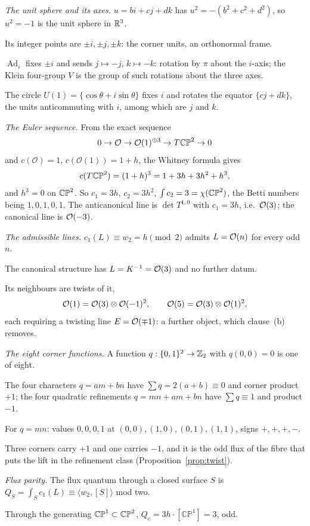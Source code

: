\documentclass[11pt,a4paper]{article}
\theoremstyle{plain}
\theoremstyle{definition}
\theoremstyle{remark}
\newcommand{\Ad}{\operatorname{Ad}}
\begin{document}
\emph{The unit sphere and its axes.} $u=bi+cj+dk$ has $u^{2}=-(b^{2}+c^{2}+d^{2})$, so $u^{2}=-1$ is the unit sphere in $\mathbb{R}^{3}$.

Its integer points are $\pm i,\pm j,\pm k$: the corner units, an orthonormal frame.

$\Ad_{i}$ fixes $\pm i$ and sends $j\mapsto-j$, $k\mapsto-k$: rotation by $\pi$ about the $i$-axis; the Klein four-group $V$ is the group of such rotations about the three axes.

The circle $U(1)=\{\cos\theta+i\sin\theta\}$ fixes $i$ and rotates the equator $\{cj+dk\}$, the units anticommuting with $i$, among which are $j$ and $k$.

\emph{The Euler sequence.} From the exact sequence
\[
0\to\mathcal{O}\to\mathcal{O}(1)^{\oplus3}\to T\mathbb{CP}^2\to0
\]
and $c(\mathcal{O})=1$, $c(\mathcal{O}(1))=1+h$, the Whitney formula gives
\[
c(T\mathbb{CP}^2)=(1+h)^{3}=1+3h+3h^{2}+h^{3},
\]
and $h^{3}=0$ on $\mathbb{CP}^2$. So $c_{1}=3h$, $c_{2}=3h^{2}$, $\int c_{2}=3=\chi(\mathbb{CP}^2)$, the Betti numbers being $1,0,1,0,1$. The anticanonical line is $\det T^{1,0}$ with $c_{1}=3h$, i.e.\ $\mathcal{O}(3)$; the canonical line is $\mathcal{O}(-3)$.

\emph{The admissible lines.} $c_{1}(L)\equiv w_{2}=h\pmod2$ admits $L=\mathcal{O}(n)$ for every odd $n$.

The canonical structure has $L=K^{-1}=\mathcal{O}(3)$ and no further datum.

Its neighbours are twists of it,
\[
\mathcal{O}(1)=\mathcal{O}(3)\otimes\mathcal{O}(-1)^{2},\qquad \mathcal{O}(5)=\mathcal{O}(3)\otimes\mathcal{O}(1)^{2},
\]
each requiring a twisting line $E=\mathcal{O}(\mp1)$: a further object, which clause~(b) removes.

\emph{The eight corner functions.} A function $q:\{0,1\}^{2}\to\mathbb{Z}_{2}$ with $q(0,0)=0$ is one of eight.

The four characters $q=am+bn$ have $\sum q=2(a+b)\equiv0$ and corner product $+1$; the four quadratic refinements $q=mn+am+bn$ have $\sum q\equiv1$ and product $-1$.

For $q=mn$: values $0,0,0,1$ at $(0,0),(1,0),(0,1),(1,1)$, signs $+,+,+,-$.

Three corners carry $+1$ and one carries $-1$, and it is the odd flux of the fibre that puts the lift in the refinement class (Proposition~\ref{prop:twist}).

\emph{Flux parity.} The flux quantum through a closed surface $S$ is $Q_{S}=\int_{S}c_{1}(L)\equiv\langle w_{2},[S]\rangle$ mod two.

Through the generating $\mathbb{CP}^{1}\subset\mathbb{CP}^2$, $Q_{c}=3h\cdot[\mathbb{CP}^{1}]=3$, odd.
\end{document}
